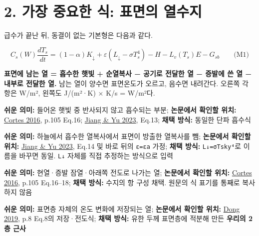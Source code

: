 \documentclass[11pt,a4paper]{article}
\begin{document}
\section{2. 가장 중요한 식: 표면의 열수지}

급수가 끝난 뒤, 동결이 없는 기본형은 다음과 같다.

\begin{equation*}
\boxed{C_s(W)\frac{dT_s}{dt}
=(1-\alpha)K_\downarrow
+\varepsilon(L_\downarrow-\sigma T_s^4)
-H-L_v(T_s)E-G_{sb}}
\qquad\text{(M1)}
\end{equation*}

\textbf{표면에 남는 열 = 흡수한 햇빛 + 순열복사 − 공기로 전달한 열 − 증발에 쓴 열 − 내부로 전달한 열.} 남는 열이 양수면 표면온도가 오르고, 음수면 내려간다. 오른쪽 각 항은 W/m², 왼쪽도 J/(m²·K) × K/s = W/m²다.

\begin{description}[leftmargin=0pt,style=nextline]
\item[\texttt{(1−α)K↓}] \textbf{쉬운 의미:} 들어온 햇빛 중 반사되지 않고 흡수되는 부분; \textbf{논문에서 확인할 위치:} \href{\detokenize{https://www.jstage.jst.go.jp/article/taiki/51/2/51_103/_pdf/-char/en}}{Cortes 2016}, p.105 Eq.16; \href{\detokenize{https://link.springer.com/article/10.1186/s43065-023-00090-9}}{Jiang \& Yu 2023}, Eq.13; \textbf{채택 방식:} 동일한 단파 흡수식
\item[\texttt{ε(L↓−σTs⁴)}] \textbf{쉬운 의미:} 하늘에서 흡수한 열복사에서 표면이 방출한 열복사를 뺌; \textbf{논문에서 확인할 위치:} \href{\detokenize{https://link.springer.com/article/10.1186/s43065-023-00090-9}}{Jiang \& Yu 2023}, Eq.14 및 바로 뒤의 \texttt{ε=εa} 가정; \textbf{채택 방식:} \texttt{L↓=σTsky⁴}로 이름을 바꾸면 동일. \texttt{L↓} 자체를 직접 추정하는 방식으로 입력
\item[\texttt{−H−LvE−Gsb}] \textbf{쉬운 의미:} 현열·증발 잠열·아래쪽 전도로 나가는 열; \textbf{논문에서 확인할 위치:} \href{\detokenize{https://www.jstage.jst.go.jp/article/taiki/51/2/51_103/_pdf/-char/en}}{Cortes 2016}, p.105 Eq.16–18; \textbf{채택 방식:} 수지의 항 구성 채택. 원문의 식 표기를 통째로 복사하지 않음
\item[\texttt{Cs dTs/dt}] \textbf{쉬운 의미:} 표면층 자체의 온도 변화에 저장되는 열; \textbf{논문에서 확인할 위치:} \href{\detokenize{https://mdpi-res.com/d_attachment/materials/materials-12-02546/article_deploy/materials-12-02546.pdf}}{Dong 2019}, p.8 Eq.8의 저장·전도식; \textbf{채택 방식:} 유한 두께 표면층에 적분해 만든 \textbf{우리의 2층 근사}
\end{description}
\end{document}
